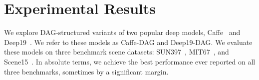 \documentclass[10pt,twocolumn,letterpaper]{article}
\begin{document}
\section{Experimental Results\label{sec:exp}}
We explore DAG-structured variants of two popular deep models, Caffe~\cite{Caffe} and Deep19~\cite{veryDeep}. We refer to these models as Caffe-DAG and Deep19-DAG. We evaluate these models on three benchmark scene datasets: SUN397~\cite{SUN397}, MIT67~\cite{MIT67}, and Scene15~\cite{Scene15}. In absolute terms, we achieve the best performance ever reported on all three benchmarks, sometimes by a significant margin.%

\end{document}

